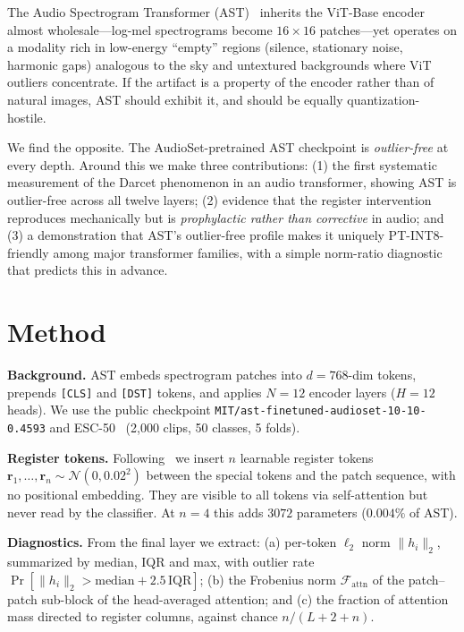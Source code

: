 \documentclass{article}
\begin{document}
The Audio Spectrogram Transformer (AST)~\cite{gong2021ast} inherits the ViT-Base encoder~\cite{dosovitskiy2021image} almost wholesale---log-mel spectrograms become $16\times16$ patches---yet operates on a modality rich in low-energy ``empty'' regions (silence, stationary noise, harmonic gaps) analogous to the sky and untextured backgrounds where ViT outliers concentrate. If the artifact is a property of the encoder rather than of natural images, AST should exhibit it, and should be equally quantization-hostile.

We find the opposite. The AudioSet-pretrained AST checkpoint is \emph{outlier-free} at every depth. Around this we make three contributions: (1) the first systematic measurement of the Darcet phenomenon in an audio transformer, showing AST is outlier-free across all twelve layers; (2) evidence that the register intervention reproduces mechanically but is \emph{prophylactic rather than corrective} in audio; and (3) a demonstration that AST's outlier-free profile makes it uniquely PT-INT8-friendly among major transformer families, with a simple norm-ratio diagnostic that predicts this in advance.

\section{Method}
\textbf{Background.} AST embeds spectrogram patches into $d{=}768$-dim tokens, prepends \texttt{[CLS]} and \texttt{[DST]} tokens, and applies $N{=}12$ encoder layers ($H{=}12$ heads). We use the public checkpoint \texttt{MIT/ast-finetuned-audioset-10-10-0.4593} and ESC-50~\cite{piczak2015esc} (2{,}000 clips, 50 classes, 5 folds).

\textbf{Register tokens.} Following~\cite{darcet2024need} we insert $n$ learnable register tokens $\mathbf{r}_1,\ldots,\mathbf{r}_n\sim\mathcal{N}(0,0.02^2)$ between the special tokens and the patch sequence, with no positional embedding. They are visible to all tokens via self-attention but never read by the classifier. At $n{=}4$ this adds $3072$ parameters ($0.004\%$ of AST).

\textbf{Diagnostics.} From the final layer we extract: (a) per-token $\ell_2$ norm $\lVert h_i\rVert_2$, summarized by median, IQR and max, with outlier rate $\Pr[\lVert h_i\rVert_2 > \mathrm{median}+2.5\,\mathrm{IQR}]$; (b) the Frobenius norm $\mathcal{F}_{\text{attn}}$ of the patch--patch sub-block of the head-averaged attention; and (c) the fraction of attention mass directed to register columns, against chance $n/(L{+}2{+}n)$.
\end{document}
